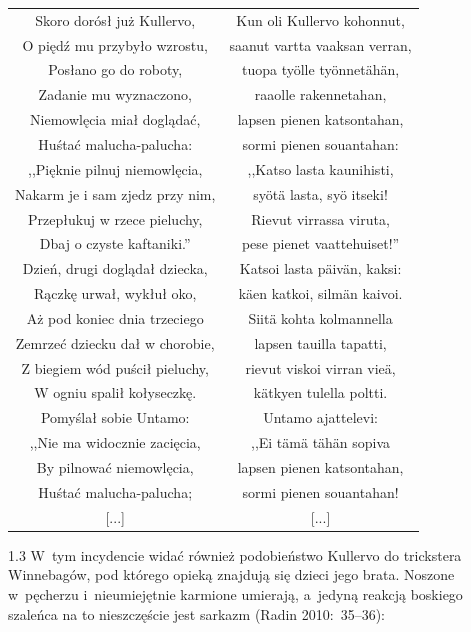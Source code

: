 \documentclass[11pt,a4paper,twoside]{report}
\begin{document}
{\centering
\small
\begin{longtable}{c c}
Skoro dorósł już Kullervo, & Kun oli Kullervo kohonnut, \\
O piędź mu przybyło wzrostu, & saanut vartta vaaksan verran, \\
Posłano go do roboty, & tuopa työlle työnnetähän, \\
Zadanie mu wyznaczono, & raaolle rakennetahan, \\
Niemowlęcia miał doglądać, & lapsen pienen katsontahan, \\
Huśtać malucha-palucha: & sormi pienen souantahan: \\
,,Pięknie pilnuj niemowlęcia, & ,,Katso lasta kaunihisti, \\
Nakarm je i sam zjedz przy nim, & syötä lasta, syö itseki! \\
Przepłukuj w rzece pieluchy, & Rievut virrassa viruta, \\
Dbaj o czyste kaftaniki.'' & pese pienet vaattehuiset!'' \\
Dzień, drugi doglądał dziecka, & Katsoi lasta päivän, kaksi: \\
Rączkę urwał, wykłuł oko, & käen katkoi, silmän kaivoi. \\
Aż pod koniec dnia trzeciego & Siitä kohta kolmannella \\
Zemrzeć dziecku dał w chorobie, & lapsen tauilla tapatti, \\
Z biegiem wód puścił pieluchy, & rievut viskoi virran vieä, \\
W ogniu spalił kołyseczkę. & kätkyen tulella poltti. \\
Pomyślał sobie Untamo: & Untamo ajattelevi: \\ \newpage
,,Nie ma widocznie zacięcia, & ,,Ei tämä tähän sopiva \\
By pilnować niemowlęcia, & lapsen pienen katsontahan, \\
Huśtać malucha-palucha; & sormi pienen souantahan! \\
{[...]} & {[...]} \\
\end{longtable}
}
\begin{spacing}{1.3}
W~tym incydencie widać również podobieństwo Kullervo do trickstera Winnebagów, pod którego opieką znajdują się dzieci jego brata. Noszone w~pęcherzu i~nieumiejętnie karmione umierają, a~jedyną reakcją boskiego szaleńca na to nieszczęście jest sarkazm (Radin 2010:~35--36):
\end{spacing}
\end{document}
